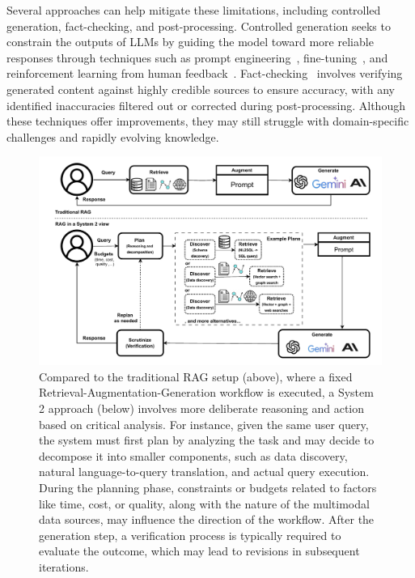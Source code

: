 %
Several approaches can help mitigate these limitations, including controlled generation, fact-checking, and post-processing. Controlled generation seeks to constrain the outputs of LLMs by guiding the model toward more reliable responses through techniques such as prompt engineering~\cite{brown2020language,wei2022chain,sahoo2024systematic}, fine-tuning~\cite{houlsby2019parameter,qin2023towards}, and reinforcement learning from human feedback~\cite{ouyang2022training}.
Fact-checking~\cite{thorne-etal-2018-fever,aly2021feverous} involves verifying generated content against highly credible sources to ensure accuracy, with any identified inaccuracies filtered out or corrected during post-processing. 
Although these techniques offer improvements, they may still struggle with domain-specific challenges and rapidly evolving knowledge.
\begin{figure}[t!] 
  \centering
  \includegraphics[width=\linewidth]{submissions/Estevam2024/figures/sys-rag2.pdf}
  \caption{Compared to the traditional RAG setup (above), where a fixed Retrieval-Augmentation-Generation workflow is executed, a System 2 approach (below) involves more deliberate reasoning and action based on critical analysis. For instance, given the same user query, the system must first plan by analyzing the task and may decide to decompose it into smaller components, such as data discovery, natural language-to-query translation, and actual query execution. During the planning phase, constraints or budgets related to factors like time, cost, or quality, along with the nature of the multimodal data sources, may influence the direction of the workflow. After the generation step, a verification process is typically required to evaluate the outcome, which may lead to revisions in subsequent iterations.}
  \label{fig:sys-rag2} 
\end{figure}
